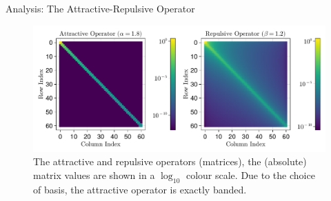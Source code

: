 \documentclass[aspectratio=169, hyperref={colorlinks=true}]{beamer}
\begin{document}
  \begin{frame}{Analysis: The Attractive-Repulsive Operator}
    \begin{figure}[H]
      \centering
      \includegraphics[width=0.9\linewidth]{results/attrep/attractive-repulsive-operators.pdf}
      \caption[Attractive and repulsive operators.]{The attractive and repulsive operators (matrices), the (absolute) matrix values are shown in a $\log_{10}$ colour scale. Due to the choice of basis, the attractive operator is exactly banded.}
      \label{fig:attractive-repulsive}
    \end{figure}
  \end{frame}
\end{document}

